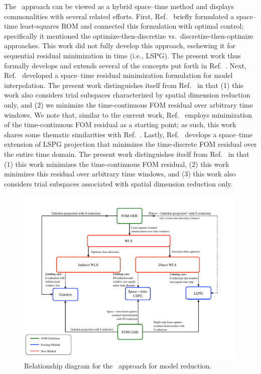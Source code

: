 \documentclass[3p,computermodern,10pt]{elsarticle}
\begin{document}
The \methodAcronym\ approach can be viewed as a hybrid space--time method and displays 
commonalities with several related efforts. 
First, Ref.~\cite{bui_thesis} briefly formulated a space--time least-squares ROM
and connected this formulation with optimal control; specifically it mentioned the
optimize-then-discretize vs.\ discretize-then-optimize approaches. This work
did not fully develop this approach, eschewing it 
for 
sequential residual minimization in time (i.e., LSPG). The present work thus
formally develops and extends several of the concepts put forth
in Ref.~\cite{bui_thesis}. Next, Ref.~\cite{constantine_strom} developed a
space--time residual minimization formulation for model interpolation.  The
present work distinguishes itself from Ref.~\cite{constantine_strom} in that
(1) this work also considers trial subspaces characterized by spatial dimension reduction only, and (2) we
minimize the time-continuous FOM residual over arbitrary time
windows. We note that,
similar to the current work, Ref.~\cite{constantine_strom} employs
minimization of the time-continuous FOM residual as a starting point; as such,
this work shares some thematic similarities with
Ref.~\cite{constantine_strom}.  Lastly, Ref.~\cite{choi_stlspg} develops a
space--time extension of LSPG projection that minimizes the time-discrete
FOM residual over the entire time domain.  The present work distinguishes
itself from Ref.~\cite{choi_stlspg} in that (1) this work minimizes the
time-continuous FOM residual, (2) this work minimizes this residual over
arbitrary time windows, and (3) this work also considers trial subspaces
associated with spatial dimension reduction only.

\begin{figure} 
\begin{centering} 
\includegraphics[trim={0.1cm 0cm 1cm 0cm},clip,width=0.99\textwidth]{diagram.pdf} 
\caption{Relationship diagram for the \methodAcronym\ approach for model
	reduction.} 
\label{fig:flowchart} 
\end{centering} 
\end{figure}
\end{document}
